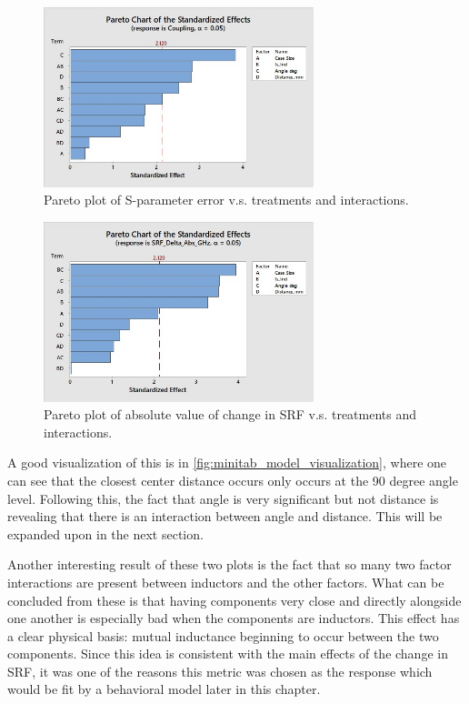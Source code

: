 \documentclass[12pt]{usfcoe}
\begin{document}
    
    \begin{figure}[H]
		\begin{center}
        	\includegraphics[width=0.7\textwidth]{images/ANOVA/pareto_coupling.jpg} 
			\caption{Pareto plot of S-parameter error v.s. treatments and interactions.} 
			\label{fig:pareto_coupling}
		\end{center}
    \end{figure}    

    \begin{figure}[H]
		\begin{center}
        	\includegraphics[width=0.7\textwidth]{images/ANOVA/pareto_abs_srf.jpg} 
			\caption{Pareto plot of absolute value of change in SRF v.s. treatments and interactions.} 
			\label{fig:pareto_abs_srf}
		\end{center}
    \end{figure}    

    A good visualization of this is in \ref{fig:minitab_model_visualization}, where one can see that the closest center distance occurs only occurs at the 90 degree angle level. 
    Following this, the fact that angle is very significant but not distance is revealing that there is an interaction between angle and distance. 
    This will be expanded upon in the next section.
    
    Another interesting result of these two plots is the fact that so many two factor interactions are present between inductors and the other factors.
    What can be concluded from these is that having components very close and directly alongside one another is especially bad when the components are inductors.
    This effect has a clear physical basis: mutual inductance beginning to occur between the two components.
    Since this idea is consistent with the main effects of the change in SRF, it was one of the reasons this metric was chosen as the response which would be fit by a behavioral model later in this chapter.
    
\end{document}
